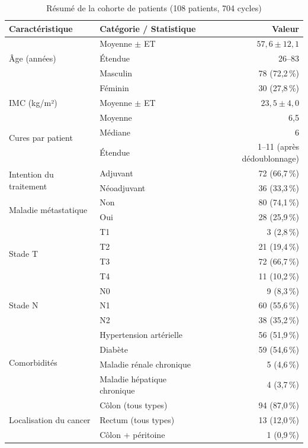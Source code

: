 \documentclass[12pt,a4paper]{report}
\begin{document}
\begin{table}[H]
\centering
\caption{Résumé de la cohorte de patients (108 patients, 704 cycles)}
\label{tab:cohort}
\begin{tabular}{llr}
\toprule
\textbf{Caractéristique} & \textbf{Catégorie / Statistique} & \textbf{Valeur} \\
\midrule
\multirow{3}{*}{Âge (années)} & Moyenne $\pm$ ET & $57{,}6 \pm 12{,}1$ \\
 & Étendue & 26--83 \\
\midrule
\multirow{2}{*}{Sexe} & Masculin & 78 (72,2\,\%) \\
 & Féminin & 30 (27,8\,\%) \\
\midrule
IMC (kg/m²) & Moyenne $\pm$ ET & $23{,}5 \pm 4{,}0$ \\
\midrule
\multirow{3}{*}{Cures par patient} & Moyenne & 6,5 \\
 & Médiane & 6 \\
 & Étendue & 1--11 (après dédoublonnage) \\
\midrule
\multirow{2}{*}{Intention du traitement} & Adjuvant & 72 (66,7\,\%) \\
 & Néoadjuvant & 36 (33,3\,\%) \\
\midrule
\multirow{2}{*}{Maladie métastatique} & Non & 80 (74,1\,\%) \\
 & Oui & 28 (25,9\,\%) \\
\midrule
\multirow{4}{*}{Stade T} & T1 & 3 (2,8\,\%) \\
 & T2 & 21 (19,4\,\%) \\
 & T3 & 72 (66,7\,\%) \\
 & T4 & 11 (10,2\,\%) \\
\midrule
\multirow{3}{*}{Stade N} & N0 & 9 (8,3\,\%) \\
 & N1 & 60 (55,6\,\%) \\
 & N2 & 38 (35,2\,\%) \\
\midrule
\multirow{4}{*}{Comorbidités} & Hypertension artérielle & 56 (51,9\,\%) \\
 & Diabète & 59 (54,6\,\%) \\
 & Maladie rénale chronique & 5 (4,6\,\%) \\
 & Maladie hépatique chronique & 4 (3,7\,\%) \\
\midrule
\multirow{3}{*}{Localisation du cancer} & Côlon (tous types) & 94 (87,0\,\%) \\
 & Rectum (tous types) & 13 (12,0\,\%) \\
 & Côlon + péritoine & 1 (0,9\,\%) \\
\bottomrule
\end{tabular}
\end{table}
\end{document}

